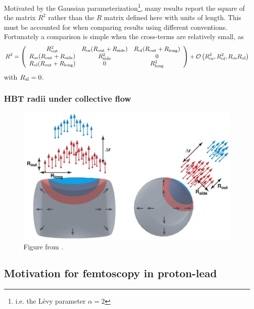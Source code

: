 Motivated by the Gaussian parameterization\footnote{i.e. the L\'evy parameter $\alpha = 2$}, many results report the square of the matrix $R^2$ rather than the $R$ matrix defined here with units of length.
This must be accounted for when comparing results using different conventions.
Fortunately a comparison is simple when the cross-terms are relatively small, as
\begin{equation}
  R^2 = \left( \begin{array}{ccc}
  R_{\mathrm{out}}^2 & R_{\mathrm{os}}(R_{\mathrm{out}}+R_{\mathrm{side}}) & R_{\mathrm{ol}}(R_{\mathrm{out}}+R_{\mathrm{long}}) \\
  R_{\mathrm{os}}(R_{\mathrm{out}}+R_{\mathrm{side}}) & R_{\mathrm{side}}^2 & 0 \\
  R_{\mathrm{ol}}(R_{\mathrm{out}}+R_{\mathrm{long}}) & 0 & R_{\mathrm{long}}^2
  \end{array} \right) + \mathcal{O}\left(  R_{\mathrm{os}}^2, R_{\mathrm{ol}}^2, R_{\mathrm{os}} R_{\mathrm{ol}}  \right)
\end{equation}
with $R_{\mathrm{sl}} = 0$.

\subsubsection{HBT radii under collective flow}
\begin{figure}[t]
  \includegraphics{hbt_radii_flow.png}
  \caption{Figure from .}
  \label{fig:hbt_flow}
\end{figure}
\cite{Kolb:2003dz} %

\subsection{Motivation for femtoscopy in proton-lead}

